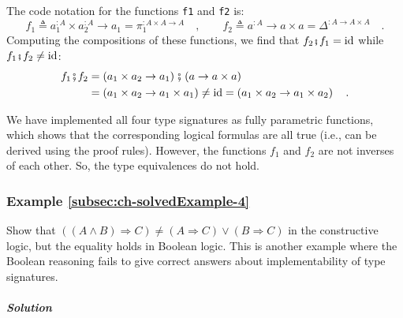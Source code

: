 The code notation for the functions \lstinline!f1! and \lstinline!f2!
is:
\[
f_{1}\triangleq a_{1}^{:A}\times a_{2}^{:A}\rightarrow a_{1}=\pi_{1}^{:A\times A\rightarrow A}\quad,\quad\quad f_{2}\triangleq a^{:A}\rightarrow a\times a=\Delta^{:A\rightarrow A\times A}\quad.
\]
Computing the compositions of these functions, we find that $f_{2}\bef f_{1}=\text{id}$
while $f_{1}\bef f_{2}\ne\text{id}$:
\begin{align*}
f_{1}\bef f_{2} & =\left(a_{1}\times a_{2}\rightarrow a_{1}\right)\bef\left(a\rightarrow a\times a\right)\\
 & =\left(a_{1}\times a_{2}\rightarrow a_{1}\times a_{1}\right)\neq\text{id}=\left(a_{1}\times a_{2}\rightarrow a_{1}\times a_{2}\right)\quad.
\end{align*}

We have implemented all four type signatures as fully parametric functions,
which shows that the corresponding logical formulas are all true (i.e.,
can be derived using the proof rules). However, the functions $f_{1}$
and $f_{2}$ are not inverses of each other. So, the type equivalences
do not hold.

\subsubsection{Example \label{subsec:ch-solvedExample-4}\ref{subsec:ch-solvedExample-4}}

Show that $\left(\left(A\wedge B\right)\Rightarrow C\right)\neq(A\Rightarrow C)\vee(B\Rightarrow C)$
in the constructive logic, but the equality holds in Boolean logic.
This is another example where the Boolean reasoning fails to give
correct answers about implementability of type signatures.

\subparagraph{Solution}

